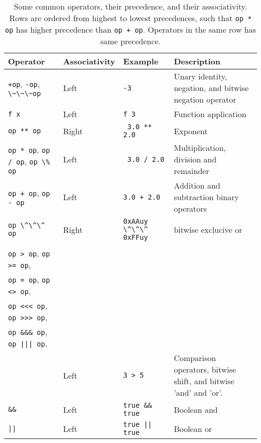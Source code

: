 \begin{table}
  \centering
  \begin{tabularx}{\linewidth}{|l|l|l|X|}
    \hline
    Operator & Associativity & Example & Description\\
    \hline
     \lstinline|+op|, \lstinline|-op|, \lstinline|\~\~\~op| & Left & \lstinline|-3| & Unary identity, negation, and bitwise negation operator\\
     \hline
    \lstinline|f x| & Left & \lstinline|f 3| & Function application\\
    \hline
    \lstinline|op ** op| & Right & \lstinline| 3.0 ** 2.0| & Exponent\\ 
    \hline
    \lstinline|op * op|, \lstinline|op / op|, \lstinline|op \% op| & Left & \lstinline| 3.0 / 2.0| & Multiplication, division and remainder\\
    \hline
    \lstinline|op + op|, \lstinline|op - op| & Left & \lstinline|3.0 + 2.0| & Addition and subtraction binary operators\\
    \hline
     \lstinline|op \^\^\^ op| & Right & \lstinline|0xAAuy \^\^\^ 0xFFuy| & bitwise exclucive or\\
    \hline
    \begin{minipage}[t]{0.25\linewidth}
      \lstinline|op < op|, \lstinline|op <= op|,\\
      \lstinline|op > op|, \lstinline|op >= op|,\\
      \lstinline|op = op|, \lstinline|op <> op|,\\
      \lstinline|op <<< op|, \lstinline|op >>> op|,\\
      {\lstinline|op &&& op|}, \lstinline!op ||| op!,\\
    \end{minipage}
    & Left & \lstinline|3 > 5| & Comparison operators, bitwise shift, and bitwise 'and' and 'or'.\\
    \hline
    {\lstinline|&&|} & Left & {\lstinline|true && true|} & Boolean and\\
    \hline
    \lstinline+||+ & Left & \lstinline+true || true+ & Boolean or\\
    \hline
  \end{tabularx}
  \caption{Some common operators, their precedence, and their associativity. Rows are ordered from highest to lowest precedences, such that \lstinline|op * op| has higher precedence than \lstinline|op + op|. Operators in the same row has same precedence. }
  \label{tab:operatorPrecedence}
\end{table}
